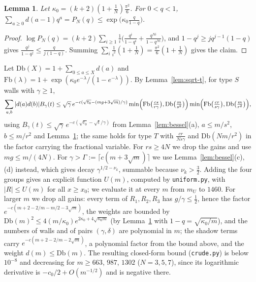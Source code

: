 \documentclass[11pt]{amsart}
\numberwithin{equation}{section}
\theoremstyle{plain}
\newtheorem{lem}[thm]{Lemma}
\theoremstyle{definition}
\theoremstyle{remark}
\begin{document}
\begin{lem}\label{lem:dbound}
Let $\kappa_0=(k+2)(1+\frac1N)\frac{\pi^2}{6}$. For $0<q<1$, $\sum_{a\ge0}d(a-1)q^a=P_N(q)\le\exp\bigl(\kappa_0\frac{q}{1-q}\bigr)$.
\end{lem}

\begin{proof}
$\log P_N(q)=(k+2)\sum_{i\ge1}\frac1i\bigl(\frac{q^i}{1-q^i}+\frac{q^{Ni}}{1-q^{Ni}}\bigr)$, and $1-q^j\ge jq^{j-1}(1-q)$ gives $\frac{q^j}{1-q^j}\le\frac{q}{j(1-q)}$. Summing $\sum_i\frac1{i^2}(1+\frac1N)=\frac{\pi^2}{6}(1+\frac1N)$ gives the claim.
\end{proof}

Let $\mathrm{Db}(X)=1+\sum_{0\le a\le X}d(a)$ and $\mathrm{Fb}(\lambda)=1+\exp(\kappa_0e^{-\lambda}/(1-e^{-\lambda}))$. By Lemma~\ref{lem:sqrt-t}, for type $S$ walls with $\gamma\ge1$,
\[
\sum_{a,b}|d(a)d(b)|B_\gamma(t)\le\sqrt\gamma\,e^{-c(\sqrt{t_0}-(mg+3\sqrt m)/\gamma)}\min\Bigl(\mathrm{Fb}\bigl(\tfrac{cs}{r\gamma}\bigr),\mathrm{Db}\bigl(\tfrac m{s^2}\bigr)\Bigr)\min\Bigl(\mathrm{Fb}\bigl(\tfrac{cr}{s\gamma}\bigr),\mathrm{Db}\bigl(\tfrac m{r^2}\bigr)\Bigr),
\]
using $B_\gamma(t)\le\sqrt\gamma\,e^{-c(\sqrt{t_0}-\sqrt t/\gamma)}$ from Lemma~\ref{lem:bessel}(a), $a\le m/s^2$, $b\le m/r^2$ and Lemma~\ref{lem:dbound}; the same holds for type $T$ with $\frac{cr}{Ns\gamma}$ and $\mathrm{Db}(Nm/r^2)$ in the factor carrying the fractional variable. For $rs\ge4N$ we drop the gains and use $mg\le m/(4N)$. For $\gamma>\Gamma:=\lceil c(m+3\sqrt m)\rceil$ we use Lemma~\ref{lem:bessel}(c),(d) instead, which gives decay $\gamma^{1/2-\nu_k}$, summable because $\nu_k>\frac32$. Adding the four groups gives an explicit function $U(m)$, computed by \texttt{uniform.py}, with $|R|\le U(m)$ for all $x\ge x_0$; we evaluate it at every $m$ from $m_U$ to $1460$. For larger $m$ we drop all gains: every term of $R_1,R_2,R_3$ has $g/\gamma\le\frac12$, hence the factor $e^{-c(m+2-2/m-m/2-3\sqrt m)}$, the weights are bounded by $\mathrm{Db}(m)^2\le 4(m/\kappa_0)e^{2\kappa_0+4\sqrt{\kappa_0m}}$ (by Lemma~\ref{lem:dbound} with $1-q=\sqrt{\kappa_0/m}$), and the numbers of walls and of pairs $(\gamma,\delta)$ are polynomial in $m$; the shadow terms carry $e^{-c(m+2-2/m-2\sqrt m)}$, a polynomial factor from the bound above, and the weight $d(m)\le\mathrm{Db}(m)$. The resulting closed-form bound (\texttt{crude.py}) is below $10^{-8}$ and decreasing for $m\ge663$, $987$, $1302$ ($N=3,5,7$), since its logarithmic derivative is $-c_0/2+O(m^{-1/2})$ and is negative there.
\end{document}

